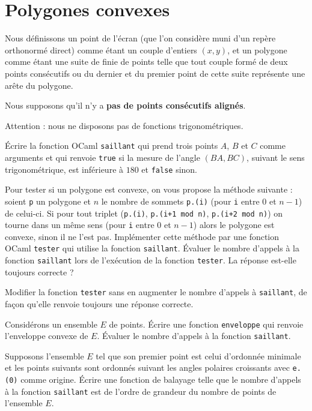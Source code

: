 \renewcommand{\SourceFile}{6-geometrie-et-images/src/6-4.ml}

\section{Polygones convexes}

Nous définissons un point de l'écran (que l'on considère muni d'un repère orthonormé direct) comme étant un couple d'entiers $(x,y)$, et un polygone comme étant une suite de finie de points telle que tout couple formé de deux points consécutifs ou du dernier et du premier point de cette suite représente une arête du polygone.
\medskip

Nous supposons qu'il n'y a \textbf{pas de points consécutifs alignés}.
\medskip

Attention : nous ne disposons pas de fonctions trigonométriques.

\Q
Écrire la fonction OCaml \texttt{saillant} qui prend trois points $A$, $B$ et $C$ comme arguments et qui renvoie \texttt{true} si la mesure de l'angle $(BA,BC)$, suivant le sens trigonométrique, est inférieure à $180$\textdegree{} et \texttt{false} sinon.

\Q
Pour tester si un polygone est convexe, on vous propose la méthode suivante : soient \texttt{p} un polygone et $n$ le nombre de sommets \texttt{p.(i)} (pour \texttt{i} entre 0 et $n-1$) de celui-ci. Si pour tout triplet (\texttt{p.(i)}, \texttt{p.(i+1 mod n)}, \texttt{p.(i+2 mod n)}) on tourne dans un même sens (pour \texttt{i} entre 0 et $n-1$) alors le polygone est convexe, sinon il ne l'est pas. Implémenter cette méthode par une fonction OCaml \texttt{tester} qui utilise la fonction \texttt{saillant}. Évaluer le nombre d'appels à la fonction \texttt{saillant} lors de l'exécution de la fonction \texttt{tester}. La réponse est-elle toujours correcte ?

\Q
Modifier la fonction \texttt{tester} sans en augmenter le nombre d'appels à \texttt{saillant}, de façon qu'elle renvoie toujours une réponse correcte.

\Q
Considérons un ensemble $E$ de points. Écrire une fonction \texttt{enveloppe} qui renvoie l'enveloppe convexe de $E$. Évaluer le nombre d'appels à la fonction \texttt{saillant}.

\Q
Supposons l'ensemble $E$ tel que son premier point est celui d'ordonnée minimale et les points suivants sont ordonnés suivant les angles polaires croissants avec \texttt{e.(0)} comme origine. Écrire une fonction de balayage telle que le nombre d'appels à la fonction \texttt{saillant} est de l'ordre de grandeur du nombre de points de l'ensemble $E$.

